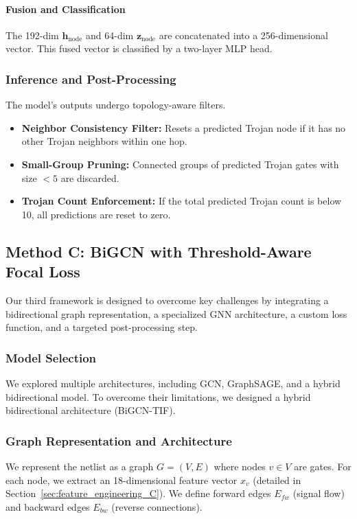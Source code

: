 \documentclass[conference]{IEEEtran}
\begin{document}
\paragraph{Fusion and Classification}
The 192-dim $\mathbf{h}_{\text{node}}$ and 64-dim $\mathbf{z}_{\text{node}}$ are concatenated into a 256-dimensional vector. This fused vector is classified by a two-layer MLP head.

\subsubsection{Inference and Post-Processing}
The model's outputs undergo topology-aware filters.
\begin{itemize}
    \item \textbf{Neighbor Consistency Filter:} Resets a predicted Trojan node if it has no other Trojan neighbors within one hop.
    \item \textbf{Small-Group Pruning:} Connected groups of predicted Trojan gates with size $< 5$ are discarded.
    \item \textbf{Trojan Count Enforcement:} If the total predicted Trojan count is below 10, all predictions are reset to zero.
\end{itemize}

\FloatBarrier
\subsection{Method C: BiGCN with Threshold-Aware Focal Loss}
\label{sec:method_C}
Our third framework is designed to overcome key challenges by integrating a bidirectional graph representation, a specialized GNN architecture, a custom loss function, and a targeted post-processing step.

\subsubsection{Model Selection}
We explored multiple architectures, including GCN, GraphSAGE, and a hybrid bidirectional model. To overcome their limitations, we designed a hybrid bidirectional architecture (BiGCN-TIF).

\subsubsection{Graph Representation and Architecture}
We represent the netlist as a graph $G=(V, E)$ where nodes $v \in V$ are gates. For each node, we extract an 18-dimensional feature vector $x_v$ (detailed in Section~\ref{sec:feature_engineering_C}). We define forward edges $E_{fw}$ (signal flow) and backward edges $E_{bw}$ (reverse connections).
\end{document}
